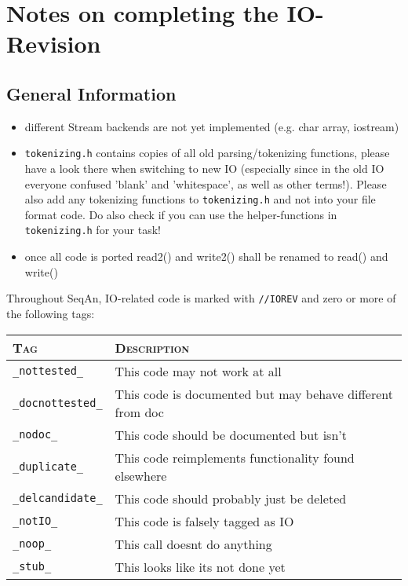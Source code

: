 \documentclass[a4paper,12pt]{scrartcl}
\begin{document}
\section{Notes on completing the IO-Revision}

\subsection{General Information}

\begin{itemize}
\item different Stream backends are not yet implemented (e.g. char array, iostream)
\item \verb#tokenizing.h# contains copies of all old parsing/tokenizing functions, please
have a look there when switching to new IO (especially since in the old IO everyone
confused 'blank' and 'whitespace', as well as other terms!). Please also add any 
tokenizing functions to \verb#tokenizing.h# and not into your file format code. Do
also check if you can use the helper-functions in \verb#tokenizing.h# for your task!
\item once all code is ported read2() and write2() shall be renamed to read() and 
write()
\end{itemize}

Throughout SeqAn, IO-related code is marked with \verb#//IOREV# and zero or more
of the following tags:

\begin{tabular}{ll}\toprule
\textsc{Tag}	& \textsc{Description}		\\\midrule
\verb#_nottested_#     &This code may not work at all \\
\verb#_docnottested_#  &This code is documented but may behave different from doc\\
\verb#_nodoc_#         &This code should be documented but isn't\\
\verb#_duplicate_#     &This code reimplements functionality found elsewhere\\
\verb#_delcandidate_#  &This code should probably just be deleted\\
\verb#_notIO_#         &This code is falsely tagged as IO\\
\verb#_noop_#          &This call doesnt do anything\\
\verb#_stub_#          &This looks like its not done yet\\\bottomrule
\end{tabular}
\end{document}
